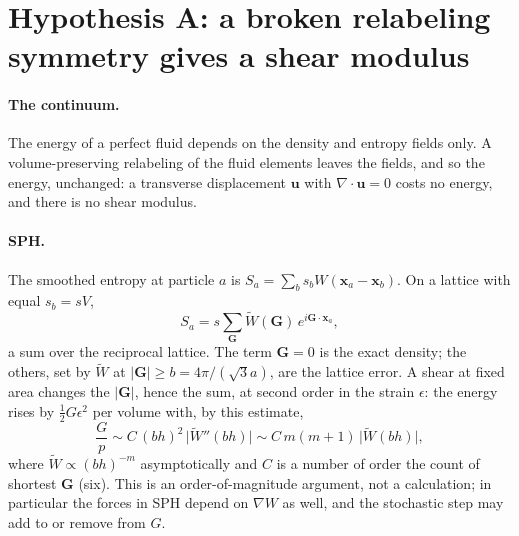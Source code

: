 \documentclass[11pt,aps,preprint,nofootinbib,superscriptaddress,tightenlines]{revtex4-2}
\def\st{\begin{equation}}
\def\stp{\end{equation}}
\let\oldparagraph\paragraph
\renewcommand{\paragraph}{\par\bigskip\oldparagraph}
\begin{document}
\section{Hypothesis A: a broken relabeling symmetry gives a shear modulus}
\label{sec:A}

\paragraph{The continuum.}  The energy of a perfect fluid depends on the density and entropy
fields only.  A volume-preserving relabeling of the fluid elements leaves the fields, and so
the energy, unchanged: a transverse displacement $\bm u$ with $\nabla\cdot\bm u=0$ costs no
energy, and there is no shear modulus.

\paragraph{SPH.}  The smoothed entropy at particle $a$ is $S_a=\sum_bs_bW(\bm x_a-\bm x_b)$.  On a
lattice with equal $s_b=sV$,
\st
S_a=s\sum_{\bm G}\tilde W(\bm G)\,e^{i\bm G\cdot\bm x_a},
\stp
a sum over the reciprocal lattice.  The term $\bm G=0$ is the exact density; the others, set by
$\tilde W$ at $|\bm G|\ge b=4\pi/(\sqrt3a)$, are the lattice error.  A shear at fixed area changes
the $|\bm G|$, hence the sum, at second order in the strain $\epsilon$: the energy rises by
$\tfrac12G\epsilon^2$ per volume with, by this estimate,
\st
\frac{G}{p}\sim C\,(bh)^2\,\big|\tilde W''(bh)\big|\sim C\,m(m+1)\,\big|\tilde W(bh)\big|,
\label{Gest}
\stp
where $\tilde W\propto(bh)^{-m}$ asymptotically and $C$ is a number of order the count of
shortest $\bm G$ (six).  This is an order-of-magnitude argument, not a calculation; in
particular the forces in SPH depend on $\nabla W$ as well, and the stochastic step may add to
or remove from $G$.
\end{document}
